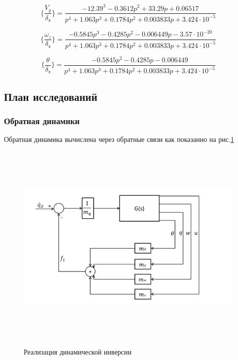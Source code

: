 \begin{equation}
    \label{eq:ПФ по вертикальной скорости СПС}
    \{ \frac{V_y}{\delta_\text{э}} \} = \frac{-12.39^3 - 0.3612p^2 + 33.29p + 0.06517}{p^4 + 1.063p^3 + 0.1784p^2 + 0.003833p + 3.424 \cdot 10^{-5}}
\end{equation}

\begin{equation}
    \label{eq:ПФ по угловой скорости тангажа СПС}
    \{ \frac{\omega_z}{\delta_\text{э}} \} = \frac{-0.5845p^3 - 0.4285p^2 - 0.006449p - 3.57 \cdot 10^{-20}}{p^4 + 1.063p^3 + 0.1784p^2 + 0.003833p + 3.424 \cdot 10^{-5}}
\end{equation}

\begin{equation}
    \label{eq:ПФ по углу наклона траектории}
    \{ \frac{\theta}{\delta_\text{э}} \} = \frac{-0.5845p^2 - 0.4285p - 0.006449}{p^4 + 1.063p^3 + 0.1784p^2 + 0.003833p + 3.424 \cdot 10^{-5}}
\end{equation}

\subsection{План исследований}
\subsubsection{Обратная динамики }
Обратная динамика вычислена через обратные связи как показанно на рис.\ref{fig:САУ_ОД}
\begin{figure}[H]
    \centering \includegraphics[width=15cm,height=10cm]{Оглавление/Part3/figures/Неполная схема СПС.png}
    \caption{Реализация динамической инверсии}
    {\label{fig:САУ_ОД}}
    \end{figure}
